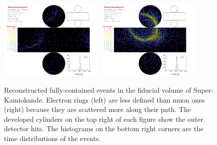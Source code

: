 \begin{figure}
	\centering
	\includegraphics[width=0.45\textwidth]{pics/Electron.pdf}
	\includegraphics[width=0.45\textwidth]{pics/Muon.pdf}
	\caption{Reconstructed fully-contained events in the fiducial volume of Super-Kamiokande.
		Electron rings (left) are less defined than muon ones (right) because they are scattered more %
		along their path.
		The developed cylinders on the top right of each figure show the outer detector hits.
		The histograms on the bottom right corners are the time distributions of the events.}
	\label{fig:sk_events}
\end{figure}

